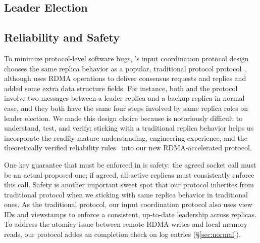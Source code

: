 




\subsection{Leader Election} \label{sec:election}



\subsection{Reliability and Safety} \label{sec:guarantees}

To minimize protocol-level software bugs, \xxx's input coordination protocol 
design chooses the same replica behavior as a popular, traditional 
\paxos protocol protocol~\cite{paxos:practical}, although \xxx uses RDMA 
operations to deliver consensus requests and replies and added some extra data 
structure fields. For instance, both \xxx and the 
protocol~\cite{paxos:practical} involve two messages between a leader replica 
and a backup replica in normal case, and they both have the same four steps 
involved by same replica roles on leader election. We made this design choice 
because \paxos is notoriously difficult to understand, test, and verify; 
sticking with a traditional replica behavior helps us incorporate the readily 
mature understanding, engineering experience, and the theoretically verified 
reliability rules~\cite{nsdi07} into our new RDMA-accelerated \paxos protocol.

One key guarantee that must be enforced in \paxos is safety: the agreed socket 
call must be an actual proposed one; if agreed, all active replicas must 
consistently enforce this call. Safety is another important sweet spot that our 
protocol inherites from traditional \paxos protocol when we sticking with same 
replica behavior in traditional ones. As the traditional protocol, our input 
coordination protocol also uses view IDs and viewstamps to enforce a consistent, 
up-to-date leadership across replicas. To address the atomicy issue between 
remote RDMA writes and local memory reads, our protocol addes an completion 
check on log entries (\S\ref{sec:normal}).



